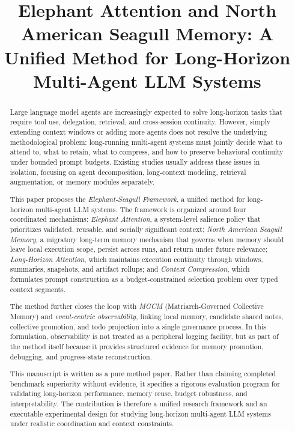 \documentclass[a4paper,fleqn]{cas-sc}
\begin{document}
\let\WriteBookmarks\relax
\def\floatpagepagefraction{1}
\def\textpagefraction{.001}

\title{Elephant Attention and North American Seagull Memory: A Unified Method for Long-Horizon Multi-Agent LLM Systems}
\date{}

\maketitle

\begin{abstract}
Large language model agents are increasingly expected to solve long-horizon tasks that require tool use, delegation, retrieval, and cross-session continuity. However, simply extending context windows or adding more agents does not resolve the underlying methodological problem: long-running multi-agent systems must jointly decide what to attend to, what to retain, what to compress, and how to preserve behavioral continuity under bounded prompt budgets. Existing studies usually address these issues in isolation, focusing on agent decomposition, long-context modeling, retrieval augmentation, or memory modules separately.

This paper proposes the \emph{Elephant-Seagull Framework}, a unified method for long-horizon multi-agent LLM systems. The framework is organized around four coordinated mechanisms: \emph{Elephant Attention}, a system-level salience policy that prioritizes validated, reusable, and socially significant context; \emph{North American Seagull Memory}, a migratory long-term memory mechanism that governs when memory should leave local execution scope, persist across runs, and return under future relevance; \emph{Long-Horizon Attention}, which maintains execution continuity through windows, summaries, snapshots, and artifact rollups; and \emph{Context Compression}, which formulates prompt construction as a budget-constrained selection problem over typed context segments.

The method further closes the loop with \emph{MGCM} (Matriarch-Governed Collective Memory) and \emph{event-centric observability}, linking local memory, candidate shared notes, collective promotion, and todo projection into a single governance process. In this formulation, observability is not treated as a peripheral logging facility, but as part of the method itself because it provides structured evidence for memory promotion, debugging, and progress-state reconstruction.

This manuscript is written as a pure method paper. Rather than claiming completed benchmark superiority without evidence, it specifies a rigorous evaluation program for validating long-horizon performance, memory reuse, budget robustness, and interpretability. The contribution is therefore a unified research framework and an executable experimental design for studying long-horizon multi-agent LLM systems under realistic coordination and context constraints.
\end{abstract}
\end{document}
